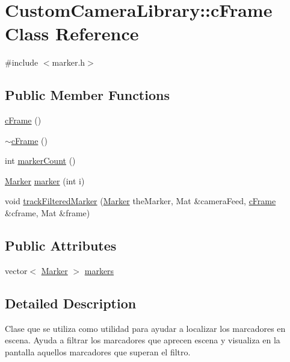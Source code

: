 \hypertarget{class_custom_camera_library_1_1c_frame}{}\section{Custom\+Camera\+Library\+:\+:c\+Frame Class Reference}
\label{class_custom_camera_library_1_1c_frame}


{\ttfamily \#include $<$marker.\+h$>$}

\subsection*{Public Member Functions}
\begin{DoxyCompactItemize}
\item 
\hyperlink{class_custom_camera_library_1_1c_frame_a20d6ba818242bb92ec7a74203bac5e49}{c\+Frame} ()
\item 
\hyperlink{class_custom_camera_library_1_1c_frame_acf0aa8c19e423193909409d9fdbf01ee}{$\sim$c\+Frame} ()
\item 
int \hyperlink{class_custom_camera_library_1_1c_frame_ad4605fcd7570099291cc810d517b2dd1}{marker\+Count} ()
\item 
\hyperlink{class_custom_camera_library_1_1_marker}{Marker} \hyperlink{class_custom_camera_library_1_1c_frame_af62553afad60e0e686a6316821bf7164}{marker} (int i)
\item 
void \hyperlink{class_custom_camera_library_1_1c_frame_aef8507b26e8431f53c66f921ccbde37c}{track\+Filtered\+Marker} (\hyperlink{class_custom_camera_library_1_1_marker}{Marker} the\+Marker, Mat \&camera\+Feed, \hyperlink{class_custom_camera_library_1_1c_frame}{c\+Frame} \&cframe, Mat \&frame)
\end{DoxyCompactItemize}
\subsection*{Public Attributes}
\begin{DoxyCompactItemize}
\item 
vector$<$ \hyperlink{class_custom_camera_library_1_1_marker}{Marker} $>$ \hyperlink{class_custom_camera_library_1_1c_frame_a62085a52666a4b2af26043107850343d}{markers}
\end{DoxyCompactItemize}


\subsection{Detailed Description}
Clase que se utiliza como utilidad para ayudar a localizar los marcadores en escena. Ayuda a filtrar los marcadores que aprecen escena y visualiza en la pantalla aquellos marcadores que superan el filtro. 


